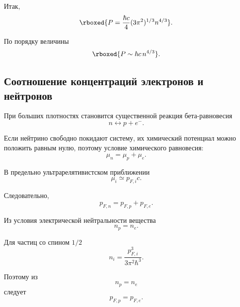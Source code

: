 \documentclass[../final.tex]{subfiles}
\begin{document}
Итак,
%
\begin{equation*}
    \rboxed{
        P
        =
        \frac{\hbar c}{4}
        (3\pi^2)^{1/3}
        n^{4/3}
    }.
\end{equation*}

По порядку величины
%
\begin{equation*}
    \rboxed{
        P
        \sim
        \hbar c\,n^{4/3}
    }.
\end{equation*}



\subsection*{Соотношение концентраций электронов и нейтронов}

При больших плотностях становится существенной реакция
бета-равновесия
%
\begin{equation*}
    n
    \longleftrightarrow
    p
    +
    e^-.
\end{equation*}

Если нейтрино свободно покидают систему, их химический потенциал
можно положить равным нулю, поэтому условие химического равновесия:
%
\begin{equation*}
    \mu_n
    =
    \mu_p
    +
    \mu_e.
\end{equation*}

В предельно ультрарелятивистском приближении
%
\begin{equation*}
    \mu_i
    \simeq
    p_{F,i}c.
\end{equation*}

Следовательно,
%
\begin{equation*}
    p_{F,n}
    =
    p_{F,p}
    +
    p_{F,e}.
\end{equation*}

Из условия электрической нейтральности вещества
%
\begin{equation*}
    n_p
    =
    n_e.
\end{equation*}

Для частиц со спином $1/2$
%
\begin{equation*}
    n_i
    =
    \frac{p_{F,i}^3}
    {3\pi^2\hbar^3}.
\end{equation*}

Поэтому из
%
\begin{equation*}
    n_p
    =
    n_e
\end{equation*}
%
следует
%
\begin{equation*}
    p_{F,p}
    =
    p_{F,e}.
\end{equation*}
\end{document}
